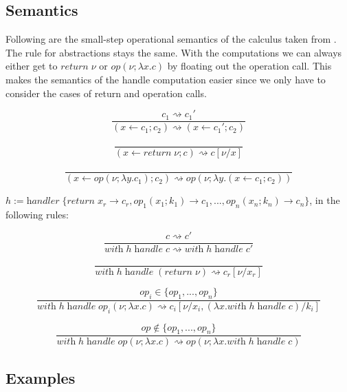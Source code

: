 \documentclass[12pt]{article}
\newcommand\eop[0]{\textit{op}}
\newcommand\val[0]{\nu}
\newcommand\vabs[2]{\lambda #1 . #2}
\newcommand\vhandler[1]{\textit{handler} \; \{#1\}}
\newcommand\comp[0]{c}
\newcommand\creturn[1]{\textit{return} \; #1}
\newcommand\cop[4]{#1(#2 ; \lambda #3 . #4)}
\newcommand\cdo[3]{#1 \leftarrow #2 ; #3}
\newcommand\chandle[2]{\textit{with} \; #1 \; \textit{handle} \; #2}
\begin{document}
\subsection{Semantics}

Following are the small-step operational semantics of the calculus taken from \cite{pretnar}.
The rule for abstractions stays the same.
With the computations we can always either get to $\creturn{\val}$ or $\cop{\eop}{\val}{x}{\comp}$ by floating out the operation call.
This makes the semantics of the handle computation easier since we only have to consider the cases of return and operation calls.

\begin{minipage}{0.5\textwidth}
\[\frac{
	\comp_1 \rightsquigarrow \comp_1'
}{
	(\cdo{x}{\comp_1}{\comp_2}) \rightsquigarrow (\cdo{x}{\comp_1'}{\comp_2})
}\]
\end{minipage}
\begin{minipage}{0.5\textwidth}
\[\frac{
}{
	(\cdo{x}{\creturn{\val}}{\comp}) \rightsquigarrow \comp[\val / x]
}\]
\end{minipage}
\[\frac{
}{
	(\cdo{x}{\cop{\eop}{\val}{y}{\comp_1}}{\comp_2}) \rightsquigarrow \cop{\eop}{\val}{y}{(\cdo{x}{\comp_1}{\comp_2})}
}\]

\vspace{20pt}
$h := \vhandler{
		\textit{return} \; x_r \rightarrow \comp_r,
		\eop_1 (  x_1 ; k_1 ) \rightarrow \comp_1,
		...,
		\eop_n ( x_n ; k_n ) \rightarrow \comp_n
	}$, in the following rules:\\
	
\begin{minipage}{0.5\textwidth}
\[\frac{
	\comp \rightsquigarrow \comp'
}{
	\chandle{h}{\comp} \rightsquigarrow \chandle{h}{\comp'}
}\]
\end{minipage}
\begin{minipage}{0.5\textwidth}
\[\frac{
}{
	\chandle{h}{(\creturn{\val})} \rightsquigarrow \comp_r[\val / x_r]
}\]
\end{minipage}
\vspace{20pt}
\[\frac{
	\eop_i \in \{ \eop_1, ..., \eop_n \}
}{
	\chandle{h}{\cop{\eop_i}{\val}{x}{\comp}} \rightsquigarrow \comp_i[\val / x_i, (\vabs{x}{\chandle{h}{\comp}}) / k_i]
}\]

\[\frac{
	\eop \notin \{ \eop_1, ..., \eop_n \}
}{
	\chandle{h}{\cop{\eop}{\val}{x}{\comp}} \rightsquigarrow \cop{\eop}{\val}{x}{\chandle{h}{\comp}}
}\]

\subsection{Examples}
\inputminted{haskell}{code3.txt}
\end{document}
